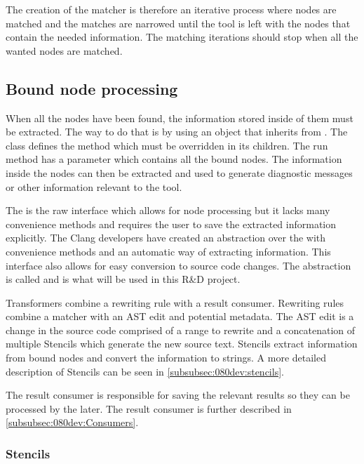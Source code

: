 The creation of the matcher is therefore an iterative process where nodes are matched and the matches are narrowed until the tool is left with the nodes that contain the needed information. The matching iterations should stop when all the wanted nodes are matched.


\subsection{Bound node processing} \label{subsec:080dev:BoundNodeProcessing}

When all the nodes have been found, the information stored inside of them must be extracted. The way to do that is by using an object that inherits from . The  class defines the  method which must be overridden in its children. The run method has a  parameter which contains all the bound nodes. The information inside the nodes can then be extracted and used to generate diagnostic messages or other information relevant to the tool.

The  is the raw interface which allows for node processing but it lacks many convenience methods and requires the user to save the extracted information explicitly. The Clang developers have created an abstraction over the  with convenience methods and an automatic way of extracting information. This interface also allows for easy conversion to source code changes. The abstraction is called  and is what will be used in this R\&D project.

Transformers combine a rewriting rule with a result consumer. Rewriting rules combine a matcher with an AST edit and potential metadata. The AST edit is a change in the source code comprised of a range to rewrite and a concatenation of multiple Stencils which generate the new source text. Stencils extract information from bound nodes and convert the information to strings. A more detailed description of Stencils can be seen in \cref{subsubsec:080dev:stencils}.

The result consumer is responsible for saving the relevant results so they can be processed by the  later. The result consumer is further described in \cref{subsubsec:080dev:Consumers}.

\subsubsection*{Stencils} \label{subsubsec:080dev:stencils}

